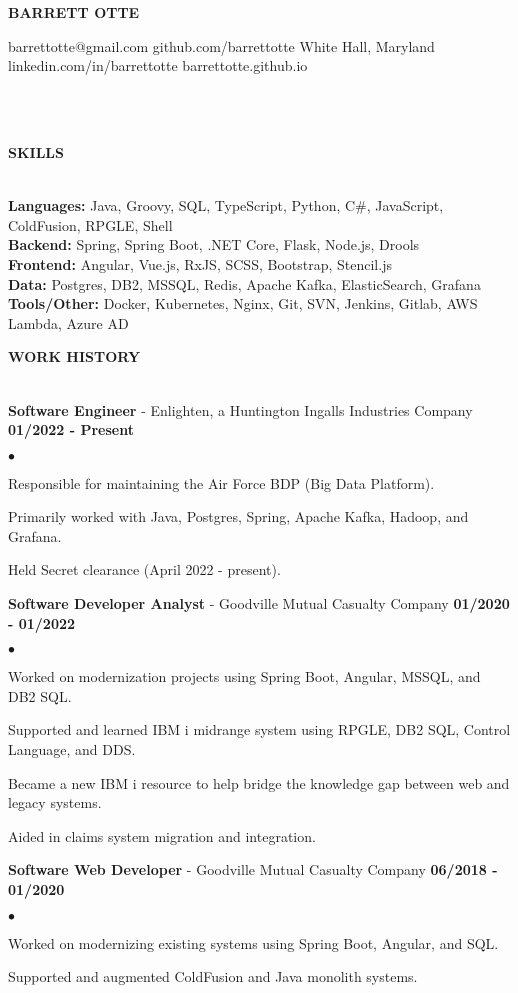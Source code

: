 \documentclass{article}
\newcommand{\lineunder}{
	\vspace*{-4pt}\\ 
	\hspace*{-18pt}\hrulefill \\
}
\newcommand{\header}[1]{
	{\hspace*{-15pt}\vspace*{6pt}\textsc{#1}}\vspace*{-6pt}\lineunder
}
\newcommand{\employer}[3]{
	\textbf{#1} - #2 \vspace*{2pt} \hfill \textbf{#3} \vspace*{2pt}
}
\newcommand{\contact}[6]{
	\begin{center}
		{\Large \textbf \scshape \bfseries{#1}}
	\end{center}
	\small{#2} \hfill \small{#3} \break
	\small{#4} \hfill \small{#5} \break
	\hspace*{20pt} \hfill \small {#6} \break
	\vspace*{-6pt}
	\lineunder
	\vspace*{-6pt}
}
\newenvironment{resumelist}{
	\vspace*{2pt}
	\begin{list}
		{\small$\bullet$}{\topsep 0pt \itemsep -2pt}}{\vspace*{4pt}
	\end{list}
}
\newcommand{\resumeheader}[1]{
	\vspace*{10pt}
	\header{\textbf{#1}}
    \vspace*{3pt}
}
\begin{document}
	\normalsize
	\smallskip
	\vspace*{-44pt}

	\contact
		{BARRETT OTTE}
		{barrettotte@gmail.com}
		{github.com/barrettotte}
		{White Hall, Maryland}
		{linkedin.com/in/barrettotte}
		{barrettotte.github.io}

	\resumeheader{SKILLS}
		\textbf{Languages:}
			Java, Groovy, SQL, TypeScript, Python, C\#, JavaScript, ColdFusion, RPGLE, Shell\\
			\vspace*{5pt}
        \textbf{Backend:}
			Spring, Spring Boot, .NET Core, Flask, Node.js, Drools\\
			\vspace*{5pt}
		\textbf{Frontend:}
			Angular, Vue.js, RxJS, SCSS, Bootstrap, Stencil.js\\
			\vspace*{5pt}
        \textbf{Data:}
			Postgres, DB2, MSSQL, Redis, Apache Kafka, ElasticSearch, Grafana\\
			\vspace*{5pt}
		\textbf{Tools/Other:}
			Docker, Kubernetes, Nginx, Git, SVN, Jenkins, Gitlab, AWS Lambda, Azure AD\\
			\vspace*{5pt}

	\resumeheader{WORK HISTORY}
		\employer
			{Software Engineer}{Enlighten, a Huntington Ingalls Industries Company}{01/2022 - Present}
			\begin{resumelist}
				\item Responsible for maintaining the Air Force BDP (Big Data Platform).
				\item Primarily worked with Java, Postgres, Spring, Apache Kafka, Hadoop, and Grafana.
				\item Held Secret clearance (April 2022 - present).
			\end{resumelist}
			\vspace*{6pt}
        \employer
			{Software Developer Analyst}{Goodville Mutual Casualty Company}{01/2020 - 01/2022}
			\begin{resumelist}
				\item Worked on modernization projects using Spring Boot, Angular, MSSQL, and DB2 SQL.
				\item Supported and learned IBM i midrange system using RPGLE, DB2 SQL, Control Language, and DDS.
				\item Became a new IBM i resource to help bridge the knowledge gap between web and legacy systems.
				\item Aided in claims system migration and integration.
			\end{resumelist}
            \vspace*{6pt}
		\employer
			{Software Web Developer}{Goodville Mutual Casualty Company}{06/2018 - 01/2020}
			\begin{resumelist}
				\item Worked on modernizing existing systems using Spring Boot, Angular, and SQL.
				\item Supported and augmented ColdFusion and Java monolith systems.
			\end{resumelist}
\end{document}
